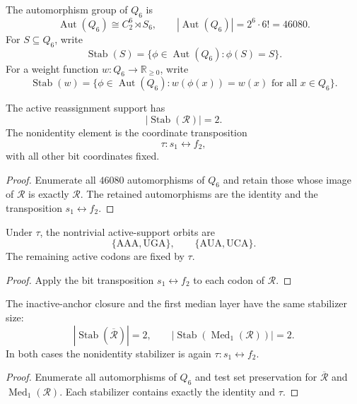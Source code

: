 \begin{definition}
\label{def:philosophy-hypercube-automorphism-stabilizer}
The automorphism group of $Q_{6}$ is
$$
  \operatorname{Aut}(Q_{6})\cong C_{2}^{6}\rtimes S_{6},
  \qquad
  |\operatorname{Aut}(Q_{6})|=2^{6}\cdot 6!=46080.
$$
For $S\subseteq Q_{6}$, write
$$
  \operatorname{Stab}(S)
  =
  \{\phi\in\operatorname{Aut}(Q_{6}):\phi(S)=S\}.
$$
For a weight function $w:Q_{6}\to\mathbb{R}_{\ge 0}$, write
$$
  \operatorname{Stab}(w)
  =
  \{\phi\in\operatorname{Aut}(Q_{6}):w(\phi(x))=w(x)\text{ for all }x\in Q_{6}\}.
$$
\end{definition}

\begin{theorem}
\label{thm:philosophy-active-support-stabilizer}
The active reassignment support has
$$
  |\operatorname{Stab}(\mathcal{R})|=2.
$$
The nonidentity element is the coordinate transposition
$$
  \tau:s_{1}\leftrightarrow f_{2},
$$
with all other bit coordinates fixed.
\end{theorem}
\begin{proof}
Enumerate all $46080$ automorphisms of $Q_{6}$ and retain those whose
image of $\mathcal{R}$ is exactly $\mathcal{R}$. The retained
automorphisms are the identity and the transposition
$s_{1}\leftrightarrow f_{2}$.
\end{proof}

\begin{corollary}
\label{cor:philosophy-hidden-c2-orbit-structure}
Under $\tau$, the nontrivial active-support orbits are
$$
  \{\mathrm{AAA},\mathrm{UGA}\},
  \qquad
  \{\mathrm{AUA},\mathrm{UCA}\}.
$$
The remaining active codons are fixed by $\tau$.
\end{corollary}
\begin{proof}
Apply the bit transposition $s_{1}\leftrightarrow f_{2}$ to each codon
of $\mathcal{R}$.
\end{proof}

\begin{theorem}
\label{thm:philosophy-hidden-c2-persists}
The inactive-anchor closure and the first median layer have the same
stabilizer size:
$$
  |\operatorname{Stab}(\overline{\mathcal{R}})|=2,
  \qquad
  |\operatorname{Stab}(\operatorname{Med}_{1}(\mathcal{R}))|=2.
$$
In both cases the nonidentity stabilizer is again
$\tau:s_{1}\leftrightarrow f_{2}$.
\end{theorem}
\begin{proof}
Enumerate all automorphisms of $Q_{6}$ and test set preservation for
$\overline{\mathcal{R}}$ and
$\operatorname{Med}_{1}(\mathcal{R})$. Each stabilizer contains exactly
the identity and $\tau$.
\end{proof}

